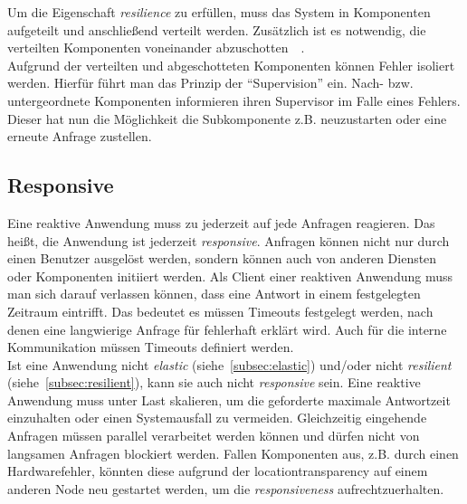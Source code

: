 Um die Eigenschaft \textit{resilience} zu erfüllen, muss das System in Komponenten aufgeteilt und anschließend verteilt werden. Zusätzlich ist es notwendig, die verteilten Komponenten voneinander abzuschotten~\cite[S.~34]{kuhn_reactive_2015}~\cite[S.~7]{vernon_reactive_2016}.\\
Aufgrund der verteilten und abgeschotteten Komponenten können Fehler isoliert werden. Hierfür führt man das Prinzip der \enquote{Supervision} ein. Nach- bzw. untergeordnete Komponenten informieren ihren Supervisor im Falle eines Fehlers. Dieser hat nun die Möglichkeit die Subkomponente z.B. neuzustarten oder eine erneute Anfrage zustellen. 

\subsection{Responsive}\label{subsec:responsive}
Eine reaktive Anwendung muss zu jederzeit auf jede Anfragen reagieren. Das heißt, die Anwendung ist jederzeit \textit{responsive}. Anfragen können nicht nur durch einen Benutzer ausgelöst werden, sondern können auch von anderen Diensten oder Komponenten initiiert werden. Als Client einer reaktiven Anwendung muss man sich darauf verlassen können, dass eine Antwort in einem festgelegten Zeitraum eintrifft. Das bedeutet es müssen Timeouts festgelegt werden, nach denen eine langwierige Anfrage für fehlerhaft erklärt wird. Auch für die interne Kommunikation müssen Timeouts definiert werden.\\
Ist eine Anwendung nicht \textit{elastic} (siehe~\ref{subsec:elastic}) und/oder nicht \textit{resilient} (siehe~\ref{subsec:resilient}), kann sie auch nicht \textit{responsive} sein. Eine reaktive Anwendung muss unter Last skalieren, um die geforderte maximale Antwortzeit einzuhalten oder einen Systemausfall zu vermeiden. Gleichzeitig eingehende Anfragen müssen parallel verarbeitet werden können und dürfen nicht von langsamen Anfragen blockiert werden. Fallen Komponenten aus, z.B. durch einen Hardwarefehler, könnten diese aufgrund der \gls{locationtransparency} auf einem anderen Node neu gestartet werden, um die \textit{responsiveness} aufrechtzuerhalten.

\pagebreak

